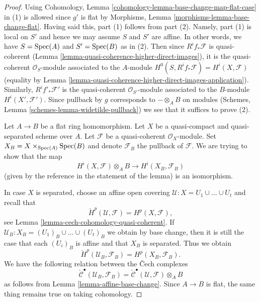 \begin{proof}
Using Cohomology, Lemma \ref{cohomology-lemma-base-change-map-flat-case} in (1)
is allowed since $g'$ is flat by
Morphisms, Lemma \ref{morphisms-lemma-base-change-flat}.
Having said this, part (1) follows from part (2). Namely,
part (1) is local on $S'$ and hence we may assume $S$
and $S'$ are affine. In other words, we have $S = \mathop{\mathrm{Spec}}(A)$
and $S' = \mathop{\mathrm{Spec}}(B)$ as in (2).
Then since $R^if_*\mathcal{F}$ is quasi-coherent
(Lemma \ref{lemma-quasi-coherence-higher-direct-images}),
it is the quasi-coherent $\mathcal{O}_S$-module associated to the
$A$-module $H^0(S, R^if_*\mathcal{F}) = H^i(X, \mathcal{F})$
(equality by
Lemma \ref{lemma-quasi-coherence-higher-direct-images-application}).
Similarly, $R^if'_*\mathcal{F}'$ is the quasi-coherent
$\mathcal{O}_{S'}$-module associated to the $B$-module
$H^i(X', \mathcal{F}')$. Since pullback by $g$ corresponds
to $- \otimes_A B$ on modules
(Schemes, Lemma \ref{schemes-lemma-widetilde-pullback})
we see that it suffices to prove (2).

\medskip\noindent
Let $A \to B$ be a flat ring homomorphism.
Let $X$ be a quasi-compact and quasi-separated scheme over $A$.
Let $\mathcal{F}$ be a quasi-coherent $\mathcal{O}_X$-module.
Set $X_B = X \times_{\mathop{\mathrm{Spec}}(A)} \mathop{\mathrm{Spec}}(B)$ and denote
$\mathcal{F}_B$ the pullback of $\mathcal{F}$.
We are trying to show that the map
$$
H^i(X, \mathcal{F}) \otimes_A B \longrightarrow H^i(X_B, \mathcal{F}_B)
$$
(given by the reference in the statement of the lemma)
is an isomorphism.

\medskip\noindent
In case $X$ is separated, choose an affine open covering
$\mathcal{U} : X = U_1 \cup \ldots \cup U_t$ and recall that
$$
\check{H}^p(\mathcal{U}, \mathcal{F}) = H^p(X, \mathcal{F}),
$$
see
Lemma \ref{lemma-cech-cohomology-quasi-coherent}.
If $\mathcal{U}_B : X_B = (U_1)_B \cup \ldots \cup (U_t)_B$ we obtain
by base change, then it is still the case that each $(U_i)_B$ is affine
and that $X_B$ is separated. Thus we obtain
$$
\check{H}^p(\mathcal{U}_B, \mathcal{F}_B) = H^p(X_B, \mathcal{F}_B).
$$
We have the following relation between the {\v C}ech complexes
$$
\check{\mathcal{C}}^\bullet(\mathcal{U}_B, \mathcal{F}_B) =
\check{\mathcal{C}}^\bullet(\mathcal{U}, \mathcal{F}) \otimes_A B
$$
as follows from
Lemma \ref{lemma-affine-base-change}.
Since $A \to B$ is flat, the same thing remains true on taking cohomology.


\end{proof}
